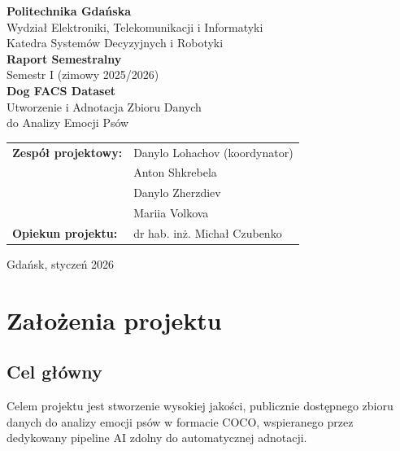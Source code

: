 \documentclass[12pt,a4paper]{article}
\begin{document}
\begin{titlepage}
    \centering
    \vspace*{1cm}

    {\Large\textbf{Politechnika Gdańska}}\\[0.3cm]
    {\large Wydział Elektroniki, Telekomunikacji i Informatyki}\\[0.3cm]
    {\large Katedra Systemów Decyzyjnych i Robotyki}\\[2cm]

    {\Huge\textbf{Raport Semestralny}}\\[0.5cm]
    {\Large Semestr I (zimowy 2025/2026)}\\[2cm]

    {\LARGE\textbf{Dog FACS Dataset}}\\[0.3cm]
    {\large Utworzenie i Adnotacja Zbioru Danych\\do Analizy Emocji Psów}\\[3cm]

    \begin{tabular}{ll}
        \textbf{Zespół projektowy:} & Danylo Lohachov (koordynator)\\
        & Anton Shkrebela\\
        & Danylo Zherzdiev\\
        & Mariia Volkova\\[0.5cm]
        \textbf{Opiekun projektu:} & dr hab. inż. Michał Czubenko\\
    \end{tabular}

    \vfill

    {\large Gdańsk, styczeń 2026}
\end{titlepage}

\tableofcontents
\newpage

\section{Założenia projektu}

\subsection{Cel główny}

Celem projektu jest stworzenie wysokiej jakości, publicznie dostępnego zbioru danych do analizy emocji psów w formacie COCO, wspieranego przez dedykowany pipeline AI zdolny do automatycznej adnotacji.
\end{document}
